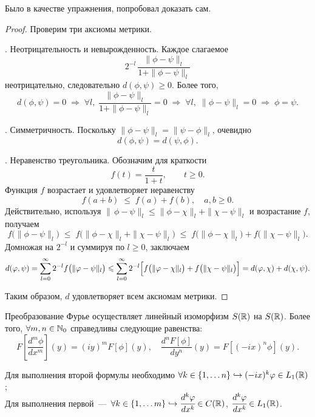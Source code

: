 \begin{note}
    Было в качестве упражнения, попробовал доказать сам.
\end{note}
\begin{proof}
    Проверим три аксиомы метрики.

    \medskip
    . Неотрицательность и невырожденность.
    Каждое слагаемое
    \[
        2^{-l}\,\frac{\|\phi-\psi\|_l}{1+\|\phi-\psi\|_l}
    \]
    неотрицательно, следовательно $d(\phi,\psi)\ge0$. Более того,
    \[
        d(\phi,\psi)=0
        \;\Longrightarrow\;
        \forall l,\;\frac{\|\phi-\psi\|_l}{1+\|\phi-\psi\|_l}=0
        \;\Longrightarrow\;
        \forall l,\;\|\phi-\psi\|_l=0
        \;\Longrightarrow\;
        \phi=\psi.
    \]

    \medskip
    . Симметричность.
    Поскольку $\|\phi-\psi\|_l=\|\psi-\phi\|_l$, очевидно
    \[
        d(\phi,\psi)=d(\psi,\phi).
    \]

    \medskip
    . Неравенство треугольника.
    Обозначим для краткости
    \[
        f(t)=\frac{t}{1+t},\qquad t\ge0.
    \]
    Функция $f$ возрастает и удовлетворяет неравенству
    \[
        f(a+b)\;\le\;f(a)+f(b),
        \quad a,b\ge0.
    \]
    Действительно, используя
    \(\|\,\phi-\psi\|_l\le\|\phi-\chi\|_l+\|\chi-\psi\|_l\) и возрастание $f$, получаем
    \[
        f\bigl(\|\phi-\psi\|_l\bigr)
        \;\le\;
        f\bigl(\|\phi-\chi\|_l+\|\chi-\psi\|_l\bigr)
        \;\le\;
        f\bigl(\|\phi-\chi\|_l\bigr)
        +f\bigl(\|\chi-\psi\|_l\bigr).
    \]
    Домножая на $2^{-l}$ и суммируя по $l\ge0$, заключаем
    \[
        d(\phi,\psi)
        =\sum_{l=0}^\infty2^{-l}f\bigl(\|\phi-\psi\|_l\bigr)
        \le
        \sum_{l=0}^\infty2^{-l}\Bigl[f\bigl(\|\phi-\chi\|_l\bigr)
        +f\bigl(\|\chi-\psi\|_l\bigr)\Bigr]
        =d(\phi,\chi)+d(\chi,\psi).
    \]

    Таким образом, $d$ удовлетворяет всем аксиомам метрики.
\end{proof}
\begin{theorem}
    Преобразование Фурье осуществляет линейный изоморфизм $S(\R)$ на $S(\R)$.
    Более того, $\forall m, n \in \N_0$ справедливы следующие равенства:
    \[
        F\left[\dfrac{d^m \phi}{dx^m}\right](y) = (iy)^m F[\phi](y), \quad \dfrac{d^n F[\phi]}{dy^n}(y) = F[(-ix)^n \phi](y).
    \]
\end{theorem}

\begin{remark}
    Для выполнения второй формулы необходимо $\forall k \in \{1, \ldots n\} \hookrightarrow (-ix)^k \phi \in L_1 (\R)$;\\
    Для выполнения первой~---~$\forall k \in \{1, \ldots m\} \hookrightarrow \cfrac{d^k \phi}{dx^k} \in C(\R)$, $\cfrac{d^k \phi}{dx^k} \in L_1 (\R)$.
\end{remark}

